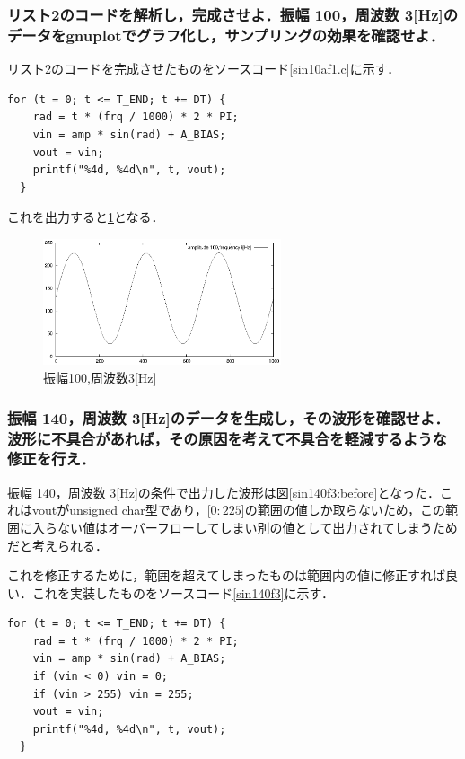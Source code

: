 \documentclass[titlepage]{jarticle}
\begin{document}
\subsubsection{リスト2のコードを解析し，完成させよ．振幅 100，周波数 3[Hz]のデータをgnuplotでグラフ化し，サンプリングの効果を確認せよ．}
リスト2のコードを完成させたものをソースコード\ref{sin10af1.c}に示す．
\begin{lstlisting}[caption=リスト2変更部分のみ,label=sin10af1.c]
  for (t = 0; t <= T_END; t += DT) {
    rad = t * (frq / 1000) * 2 * PI;
    vin = amp * sin(rad) + A_BIAS;
    vout = vin;
    printf("%4d, %4d\n", t, vout);
  }
   \end{lstlisting}

これを出力すると\ref{sin100f3}となる．
\begin{figure}[H]
  \centering
  \includegraphics[width=7cm]{EPS/sin100f3.eps}
  \caption{振幅100,周波数3[Hz]}
  \label{sin100f3}
\end{figure}
\subsubsection{振幅 140，周波数 3[Hz]のデータを生成し，その波形を確認せよ．波形に不具合があれば，その原因を考えて不具合を軽減するような修正を行え．}
振幅 140，周波数 3[Hz]の条件で出力した波形は図\ref{sin140f3:before}となった．これはvoutがunsigned char型であり，[$0:225$]の範囲の値しか取らないため，この範囲に入らない値はオーバーフローしてしまい別の値として出力されてしまうためだと考えられる．

これを修正するために，範囲を超えてしまったものは範囲内の値に修正すれば良い．これを実装したものをソースコード\ref{sin140f3}に示す．
\begin{lstlisting}[caption=修正後,label=sin140f3]
  for (t = 0; t <= T_END; t += DT) {
    rad = t * (frq / 1000) * 2 * PI;
    vin = amp * sin(rad) + A_BIAS;
    if (vin < 0) vin = 0;
    if (vin > 255) vin = 255;
    vout = vin;
    printf("%4d, %4d\n", t, vout);
  }
   \end{lstlisting}
\end{document}
